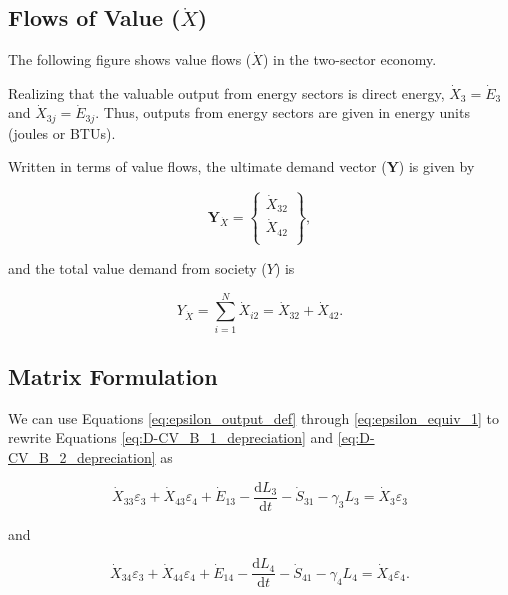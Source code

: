 \documentclass[authoryear,preprint,review,12pt]{elsarticle}
\renewcommand{\vec}[1]{\mathbf{#1}}
\begin{document}
\subsection{Flows of Value ($\dot{X}$)}

The following figure shows value flows ($\dot{X}$) in the two-sector economy.

Realizing that the valuable output from energy sectors is direct energy, $\dot{X}_{3} = \dot{E}_{3}$ and $\dot{X}_{3j} = \dot{E}_{3j}$. Thus, outputs from energy sectors are given in energy units (joules or BTUs). 

Written in terms of value flows, the ultimate demand vector ($\vec{Y}$) is given by

\begin{equation} \label{eq:D-demand_vector_B_dot}
	\vec{Y}_{\dot{X}} = 	\begin{Bmatrix} 	\dot{X}_{32}	\\
																\dot{X}_{42}	\\
									\end{Bmatrix},
\end{equation}

\noindent and the total value demand from society ($Y$) is 

\begin{equation} \label{eq:D-total_value_demand}
	Y_{\dot{X}} = \sum_{i=1}^{N} \dot{X}_{i2} = \dot{X}_{32} + \dot{X}_{42}.
	\end{equation}

\subsection{Matrix Formulation}

We can use Equations \ref{eq:epsilon_output_def} through \ref{eq:epsilon_equiv_1} to rewrite Equations \ref{eq:D-CV_B_1_depreciation} and \ref{eq:D-CV_B_2_depreciation} as

\begin{equation} \label{eq:D-CV_B_3_with_eps}
	\dot{X}_{33}\varepsilon_{3} + \dot{X}_{43}\varepsilon_{4} + \dot{E}_{13} - \frac{\mathrm{d}L_{3}}{\mathrm{d}t} - \dot{S}_{31} - \gamma_{3}L_{3} = \dot{X}_{3}\varepsilon_{3}
\end{equation}

\noindent and 

\begin{equation} \label{eq:D-CV_B_4_with_eps}
	\dot{X}_{34}\varepsilon_{3} + \dot{X}_{44}\varepsilon_{4} + \dot{E}_{14} - \frac{\mathrm{d}L_{4}}{\mathrm{d}t} - \dot{S}_{41} - \gamma_{4}L_{4} = \dot{X}_{4}\varepsilon_{4}.
\end{equation}
\end{document}
